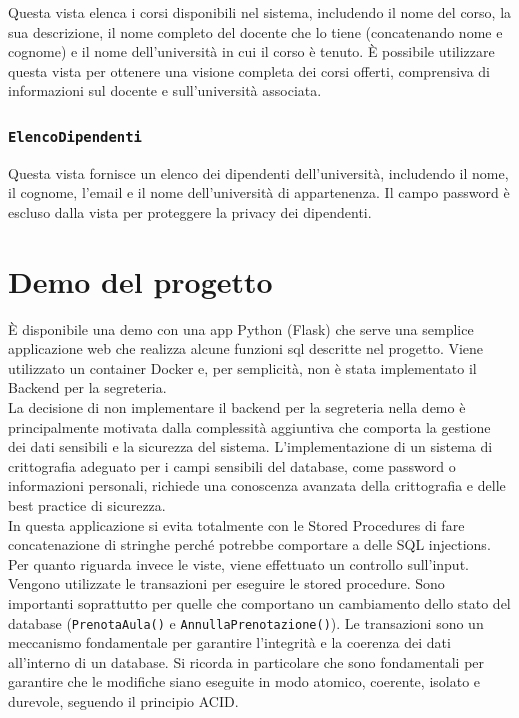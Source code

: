 \documentclass[a4paper, 10pt, oneside]{article} %
\begin{document}
Questa vista elenca i corsi disponibili nel sistema, includendo il nome del corso, la sua descrizione, il nome completo del docente che lo tiene (concatenando nome e cognome) e il nome dell'università in cui il corso è tenuto. È possibile utilizzare questa vista per ottenere una visione completa dei corsi offerti, comprensiva di informazioni sul docente e sull'università associata.

\subsubsection*{\texttt{ElencoDipendenti}}
Questa vista fornisce un elenco dei dipendenti dell'università, includendo il nome, il cognome, l'email e il nome dell'università di appartenenza. Il campo password è escluso dalla vista per proteggere la privacy dei dipendenti.



\section{Demo del progetto}
È disponibile una demo con una app Python (Flask) che serve una semplice applicazione web che realizza alcune funzioni sql descritte nel progetto. Viene utilizzato un container Docker e, per semplicità, non è stata implementato il Backend per la segreteria.\\

La decisione di non implementare il backend per la segreteria nella demo è principalmente motivata dalla complessità aggiuntiva che comporta la gestione dei dati sensibili e la sicurezza del sistema. L'implementazione di un sistema di crittografia adeguato per i campi sensibili del database, come password o informazioni personali, richiede una conoscenza avanzata della crittografia e delle best practice di sicurezza.\\

In questa applicazione si evita totalmente con le Stored Procedures di fare concatenazione di stringhe perché potrebbe comportare a delle SQL injections. Per quanto riguarda invece le viste, viene effettuato un controllo sull'input.\\

Vengono utilizzate le transazioni per eseguire le stored procedure. Sono importanti soprattutto per quelle che comportano un cambiamento dello stato del database (\texttt{PrenotaAula()} e \texttt{AnnullaPrenotazione()}). Le transazioni sono un meccanismo fondamentale per garantire l'integrità e la coerenza dei dati all'interno di un database. Si ricorda in particolare che sono fondamentali per garantire che le modifiche siano eseguite in modo atomico, coerente, isolato e durevole, seguendo il principio ACID.
\end{document}
